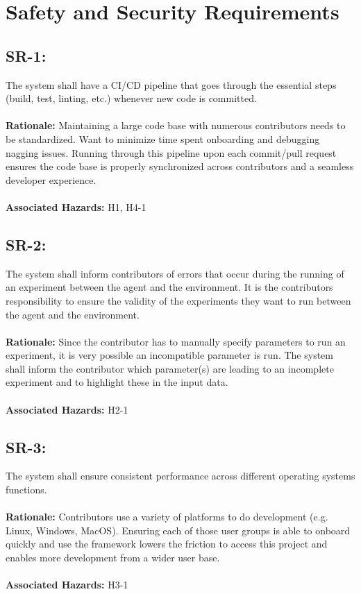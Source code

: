 \documentclass{article}
\begin{document}
\section{Safety and Security Requirements}

\subsection*{SR-1:}
The system shall have a CI/CD pipeline that goes through the essential steps (build, test, linting, etc.) whenever new code is committed. \\ \\
\textbf{Rationale:} Maintaining a large code base with numerous contributors needs to be standardized. Want to minimize time spent onboarding and debugging nagging issues. Running through this pipeline upon each commit/pull request ensures the code base is properly synchronized across contributors and a seamless developer experience. \\ \\
\textbf{Associated Hazards:} H1, H4-1

\subsection*{SR-2:}
The system shall inform contributors of errors that occur during the running of an experiment between the agent and the environment. It is the contributors responsibility to ensure the validity of the experiments they want to run between the agent and the environment. \\ \\ 
\textbf{Rationale:} Since the contributor has to manually specify parameters to run an experiment, it is very possible an incompatible parameter is run. The system shall inform the contributor which parameter(s) are leading to an incomplete experiment and to highlight these in the input data. \\ \\ 
\textbf{Associated Hazards:} H2-1

\subsection*{SR-3:}
The system shall ensure consistent performance across different operating systems functions. \\ \\
\textbf{Rationale:} Contributors use a variety of platforms to do development (e.g. Linux, Windows, MacOS). Ensuring each of those user groups is able to onboard quickly and use the framework lowers the friction to access this project and enables more development from a wider user base. \\ \\
\textbf{Associated Hazards:} H3-1
\end{document}
